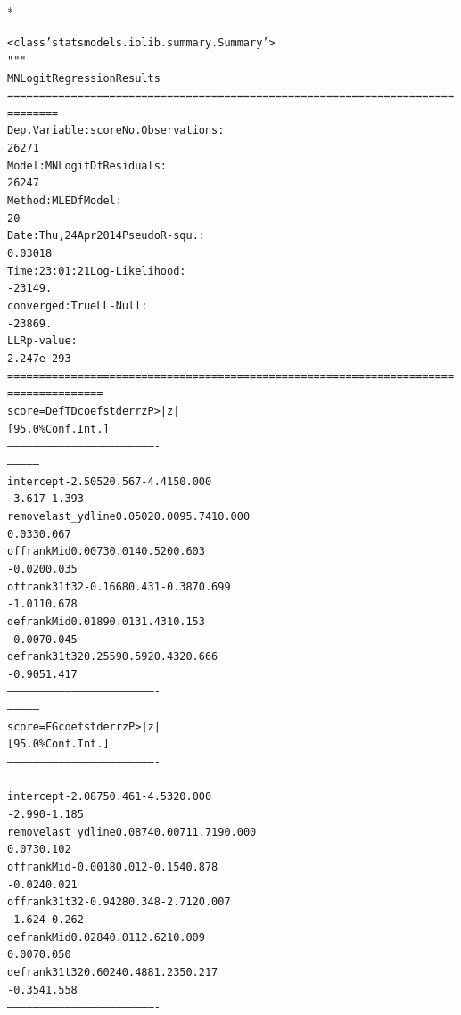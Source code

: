 \documentclass[letterpaper,10pt,english]{/anaconda/lib/python2.7/site-packages/sphinx/texinputs/sphinxhowto}
\def\smaller{\fontsize{9.5pt}{9.5pt}\selectfont}
\newenvironment{InvisibleVerbatim}
        {\begin{mdframed}[leftmargin=0.1\linewidth,innerleftmargin=3pt,innerrightmargin=3pt, userdefinedwidth=1\linewidth, linewidth=0pt, linecolor=white, usetwoside=false]}
        {\end{mdframed}}
\begin{document}
                \makebox[0.1\linewidth]{\smaller\hfill\tt\color{nbframe-out-prompt}Out\hspace{4pt}{[}14{]}:\hspace{4pt}}\\*
                \vspace{-2.55\baselineskip}\begin{InvisibleVerbatim}
                \vspace{-0.5\baselineskip}
\begin{alltt}<class 'statsmodels.iolib.summary.Summary'>
"""
                          MNLogit Regression Results
======================================================================
========
Dep. Variable:                  score   No. Observations:
26271
Model:                        MNLogit   Df Residuals:
26247
Method:                           MLE   Df Model:
20
Date:                Thu, 24 Apr 2014   Pseudo R-squ.:
0.03018
Time:                        23:01:21   Log-Likelihood:
-23149.
converged:                       True   LL-Null:
-23869.
                                        LLR p-value:
2.247e-293
======================================================================
===============
      score=DefTD       coef    std err          z      P>|z|
[95.0\% Conf. Int.]
----------------------------------------------------------------------
---------------
intercept            -2.5052      0.567     -4.415      0.000
-3.617    -1.393
removelast\_ydline     0.0502      0.009      5.741      0.000
0.033     0.067
offrankMid            0.0073      0.014      0.520      0.603
-0.020     0.035
offrank31t32         -0.1668      0.431     -0.387      0.699
-1.011     0.678
defrankMid            0.0189      0.013      1.431      0.153
-0.007     0.045
defrank31t32          0.2559      0.592      0.432      0.666
-0.905     1.417
----------------------------------------------------------------------
---------------
         score=FG       coef    std err          z      P>|z|
[95.0\% Conf. Int.]
----------------------------------------------------------------------
---------------
intercept            -2.0875      0.461     -4.532      0.000
-2.990    -1.185
removelast\_ydline     0.0874      0.007     11.719      0.000
0.073     0.102
offrankMid           -0.0018      0.012     -0.154      0.878
-0.024     0.021
offrank31t32         -0.9428      0.348     -2.712      0.007
-1.624    -0.262
defrankMid            0.0284      0.011      2.621      0.009
0.007     0.050
defrank31t32          0.6024      0.488      1.235      0.217
-0.354     1.558
----------------------------------------------------------------------

\end{alltt}
\end{InvisibleVerbatim}
\end{document}
